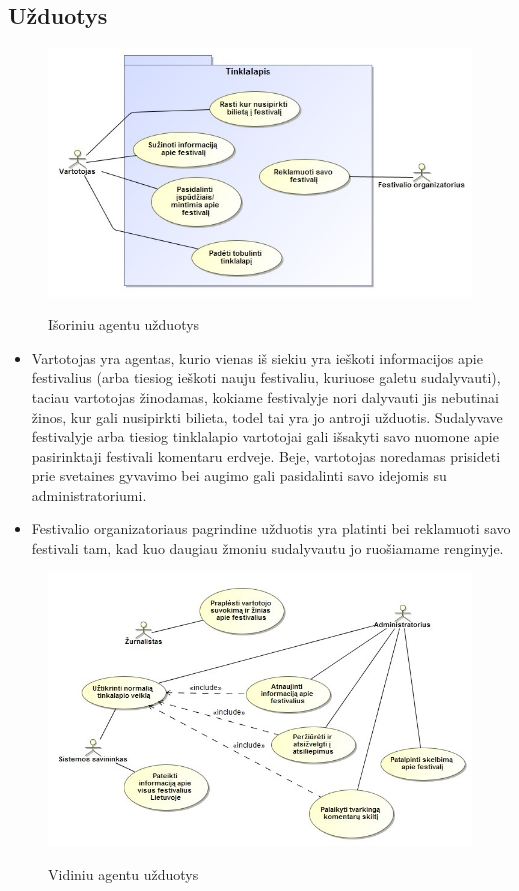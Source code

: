 ﻿\documentclass{VUMIFPSkursinis}
\begin{document}
\subsection {Užduotys}

\begin{figure}[H]
    \centering
    \includegraphics[scale=0.5]{img/geri/UzduotysIS}
    \label{img:uml2}
	\caption{Išoriniu agentu užduotys}
\end{figure}

\begin{itemize}
\item Vartotojas yra agentas, kurio vienas iš siekiu yra ieškoti informacijos apie festivalius (arba tiesiog ieškoti nauju festivaliu, kuriuose galetu sudalyvauti), taciau vartotojas žinodamas, kokiame festivalyje nori dalyvauti jis nebutinai žinos, kur gali nusipirkti bilieta, todel tai yra jo antroji užduotis. Sudalyvave festivalyje arba tiesiog tinklalapio vartotojai gali išsakyti savo nuomone apie pasirinktaji festivali komentaru erdveje. Beje, vartotojas noredamas prisideti prie svetaines gyvavimo bei augimo gali pasidalinti savo idejomis su administratoriumi.
\item Festivalio organizatoriaus pagrindine užduotis yra platinti bei reklamuoti savo festivali tam, kad kuo daugiau žmoniu sudalyvautu jo ruošiamame renginyje.
\end{itemize}

\begin{figure}[H]
    \centering
    \includegraphics[scale=0.6]{img/geri/UzduotysVID}
    \label{img:uml3}
	\caption{Vidiniu agentu užduotys}
\end{figure}
\end{document}
